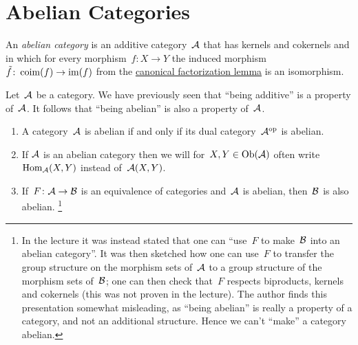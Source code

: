\section{Abelian Categories}


\begin{definition}
  An \emph{abelian category} is an additive category~$\mathcal{A}$ that has kernels and cokernels and in which for every morphism~$f \colon X \to Y$ the induced morphism~$\tilde{f} \colon \operatorname{coim}(f) \to \operatorname{im}(f)$ from the \hyperref[canonical factorization]{canonical factorization lemma} is an isomorphism.
\end{definition}


\begin{remark*}
  Let~$\mathcal{A}$ be a category.
  We have previously seen that \enquote{being additive} is a property of~$\mathcal{A}$.
  It follows that \enquote{being abelian} is also a property of~$\mathcal{A}$.
\end{remark*}


\begin{remark}
  \leavevmode
  \begin{enumerate}
    \item
      A category~$\mathcal{A}$ is abelian if and only if its dual category~$\mathcal{A}^{\mathrm{op}}$ is abelian.
    \item
      If $\mathcal{A}$ is an abelian category then we will for~$X, Y \in \operatorname{Ob}(\mathcal{A})$ often write~$\operatorname{Hom}_{\mathcal{A}}(X,Y)$ instead of~$\mathcal{A}(X,Y)$.
    \item
      If~$F \colon \mathcal{A} \to \mathcal{B}$ is an equivalence of categories and~$\mathcal{A}$ is abelian, then~$\mathcal{B}$ is also abelian.%
      \footnote{In the lecture it was instead stated that one can \enquote{use~$F$ to make~$\mathcal{B}$ into an abelian category}.
      It was then sketched how one can use~$F$ to transfer the group structure on the morphism sets of~$\mathcal{A}$ to a group structure of the morphism sets of~$\mathcal{B}$;
      one can  then check that~$F$ respects biproducts, kernels and cokernels (this was not proven in the lecture).
      The author finds this presentation somewhat misleading, as \enquote{being abelian} is really a property of a category, and not an additional structure.
      Hence we can’t \enquote{make} a category abelian.}
  \end{enumerate}
\end{remark}


